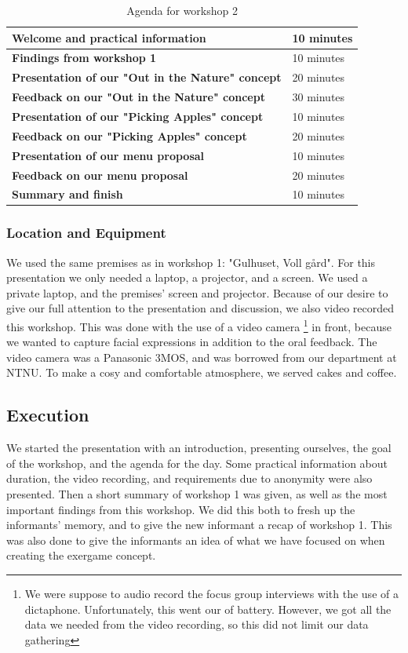 \begin{table} [ht!]
\centering
    \begin{tabular}{|l|l|}
       \hline
       \textbf{Welcome and practical information} & 10 minutes  \\ \hline
       \textbf{Findings from workshop 1} & 10 minutes \\ \hline
       \textbf{Presentation of our "Out in the Nature" concept} & 20 minutes \\ \hline
	   \textbf{Feedback on our "Out in the Nature" concept} & 30 minutes \\ \hline
	   \textbf{Presentation of our "Picking Apples" concept} & 10 minutes \\ \hline
	   \textbf{Feedback on our "Picking Apples" concept} & 20 minutes \\ \hline
	   \textbf{Presentation of our menu proposal} & 10 minutes \\ \hline
	   \textbf{Feedback on our menu proposal} & 20 minutes \\ \hline
	   \textbf{Summary and finish} & 10 minutes \\ \hline
    \end{tabular}
    \caption[Workshop 2 agenda]{Agenda for workshop 2}
    \label{tab:agendaW2}
\end{table} 


\subsubsection{Location and Equipment}
We used the same premises as in workshop 1: "Gulhuset, Voll gård". 
For this presentation we only needed a laptop, a projector, and a screen. We used a private laptop, and the premises' screen and projector. Because of our desire to give our full attention to the presentation and discussion, we also video recorded this workshop. This was done with the use of a video camera \footnote{We were suppose to audio record the focus group interviews with the use of a dictaphone. Unfortunately, this went our of battery. However, we got all the data we needed from the video recording, so this did not limit our data gathering} in front, because we wanted to capture facial expressions in addition to the oral feedback. The video camera was a Panasonic 3MOS, and was borrowed from our department at NTNU. To make a cosy and comfortable atmosphere, we served cakes and coffee.   

\subsection{Execution}
We started the presentation with an introduction, presenting ourselves, the goal of the workshop, and the agenda for the day. Some practical information about duration, the video recording, and requirements due to anonymity were also presented. Then a short summary of workshop 1 was given, as well as the most important findings from this workshop. We did this both to fresh up the informants' memory, and to give the new informant a recap of workshop 1. This was also done to give the informants an idea of what we have focused on when creating the exergame concept.    

